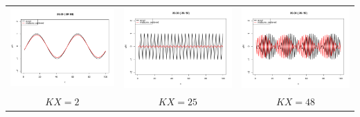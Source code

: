 \documentclass[a4paper,fleqn]{article}
\begin{document}
\begin{enumerate}
\begin{center}
\begin{tabular}{ccc}
				\includegraphics[scale=0.3]{matsuno_long}	& \includegraphics[scale=0.3]{matsuno_medium}	&	\includegraphics[scale=0.3]{matsuno_short}\\
				$KX=2$	&	$KX=25$	&	$KX=48$
			\end{tabular}\hspace*{-50mm}
		\end{center}
\end{enumerate}
%
\end{document}

